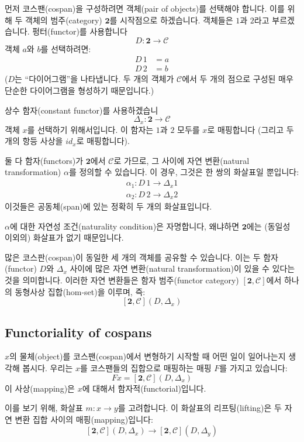 \documentclass[DaoFP]{subfiles}
\begin{document}
먼저 코스팬(cospan)을 구성하려면 객체(pair of objects)를 선택해야 합니다. 이를 위해 두 객체의 범주(category) $\mathbf{2}$를 시작점으로 하겠습니다. 객체들은 $1$과 $2$라고 부르겠습니다.
펑터(functor)를 사용합니다
\[ D \colon \mathbf{2} \to \mathcal{C}\]
객체 $a$와 $b$를 선택하려면:
\begin{align*}
D\, 1 &= a \\
D\, 2 &= b 
\end{align*}
($D$는 ``다이어그램''을 나타냅니다. 두 개의 객체가 $\mathcal{C}$에서 두 개의 점으로 구성된 매우 단순한 다이어그램을 형성하기 때문입니다.)

상수 함자(constant functor)를 사용하겠습니
\[ \Delta_x \colon \mathbf{2} \to \mathcal{C} \]
객체 $x$를 선택하기 위해서입니다. 이 함자는 $1$과 $2$ 모두를 $x$로 매핑합니다 (그리고 두 개의 항등 사상을 $id_x$로 매핑합니다).

둘 다 함자(functors)가 $\mathbf{2}$에서 $\mathcal{C}$로 가므로, 그 사이에 자연 변환(natural transformation) $\alpha$를 정의할 수 있습니다. 이 경우, 그것은 한 쌍의 화살표일 뿐입니다:
\begin{align*}
\alpha_1 \colon D \, 1 \to \Delta_x 1 \\
\alpha_2 \colon D \, 2 \to \Delta_x 2
\end{align*}
이것들은 공동체(span)에 있는 정확히 두 개의 화살표입니다.

$\alpha$에 대한 자연성 조건(naturality condition)은 자명합니다, 왜냐하면 $\mathbf{2}$에는 (동일성 이외의) 화살표가 없기 때문입니다.

많은 코스판(cospan)이 동일한 세 개의 객체를 공유할 수 있습니다. 이는 두 함자(functor) $D$와 $\Delta_x$ 사이에 많은 자연 변환(natural transformation)이 있을 수 있다는 것을 의미합니다. 이러한 자연 변환들은 함자 범주(functor category) $[\mathbf{2}, \mathcal{C}]$에서 하나의 동형사상 집합(hom-set)을 이루며, 즉:
\[ [\mathbf{2}, \mathcal{C}](D, \Delta_x) \]

\subsection{Functoriality of cospans}

$x$의 물체(object)를 코스팬(cospan)에서 변형하기 시작할 때 어떤 일이 일어나는지 생각해 봅시다. 우리는 $x$를 코스팬들의 집합으로 매핑하는 매핑 $F$를 가지고 있습니다:
\[ F x = [\mathbf{2}, \mathcal{C}](D, \Delta_x) \]
이 사상(mapping)은 $x$에 대해서 함자적(functorial)입니다.

이를 보기 위해, 화살표 $m \colon x \to y$를 고려합니다. 이 화살표의 리프팅(lifting)은 두 자연 변환 집합 사이의 매핑(mapping)입니다:
\[ [\mathbf{2}, \mathcal{C}](D, \Delta_x) \to [\mathbf{2}, \mathcal{C}](D, \Delta_{y}) \] 
 
\end{document}
